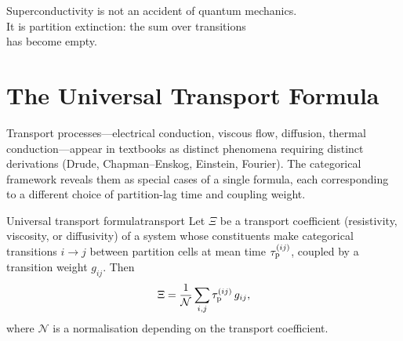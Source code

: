 
\epigraph{%
  Superconductivity is not an accident of quantum mechanics.\\
  It is partition extinction: the sum over transitions\\
  has become empty.%
}{}

\section{The Universal Transport Formula}
\label{sec:transport}

Transport processes---electrical conduction, viscous flow, diffusion,
thermal conduction---appear in textbooks as distinct phenomena requiring
distinct derivations (Drude, Chapman--Enskog, Einstein, Fourier).
The categorical framework reveals them as special cases of a single
formula, each corresponding to a different choice of partition-lag time
and coupling weight.

\begin{consequence}{Universal transport formula}{transport}
Let $\Xi$ be a transport coefficient (resistivity, viscosity, or
diffusivity) of a system whose constituents make categorical transitions
$i \to j$ between partition cells at mean time $\tau_{\mathrm{p}}^{(ij)}$, coupled by
a transition weight $g_{ij}$.  Then
\begin{equation}
  \Xi
  = \frac{1}{\mathcal{N}}
    \sum_{i,j} \tau_{\mathrm{p}}^{(ij)}\, g_{ij},
  \label{eq:transport}
\end{equation}
where $\mathcal{N}$ is a normalisation depending on the transport
coefficient.
\end{consequence}

